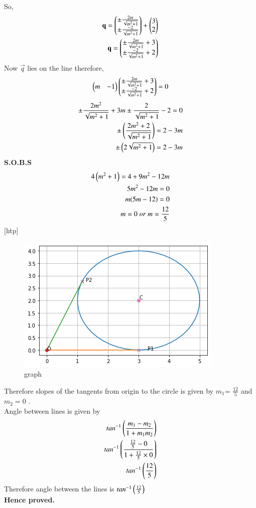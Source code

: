 \documentclass[journal,12pt,twocolumn]{IEEEtran}
\begin{document}
So,
\begin{align}
    \mathbf{q}=\begin{pmatrix}\pm \frac{2m}{\sqrt{m^2+1}} \\ \pm \frac{-2}{\sqrt{m^2+1}} \end{pmatrix} + \begin{pmatrix}3 \\ 2\end{pmatrix}\\
    \mathbf{q}= \begin{pmatrix}\pm \frac{2m}{\sqrt{m^2+1} }+3 \\ \pm \frac{-2}{\sqrt{m^2+1}} +2\end{pmatrix}
\end{align}
Now $\vec{q}$ lies on the line therefore,
\begin{align}
   \begin{pmatrix}m & -1\end{pmatrix} \begin{pmatrix}\pm \frac{2m}{\sqrt{m^2+1} }+3 \\ \pm \frac{-2}{\sqrt{m^2+1}} +2\end{pmatrix}  = 0
\end{align}
\begin{align}
    \pm \frac{2m^2}{\sqrt{m^2+1}}+ 3m  \pm\frac{2}{\sqrt{m^2+1}} -2=0 \\
    \pm\left(\frac{2m^2 + 2}{\sqrt{m^2+1}}\right)= 2-3m\\
    \pm \left(2\sqrt{m^2+1}\right)= 2-3m
\end{align}
\textbf{S.O.B.S}
\begin{align}
    4\left(m^2+1\right)=4 + 9m^2 -12m\\
    5m^2-12m=0\\
    m(5m-12)=0\\
    m=0 \;or\; m = \frac{12}{5}
\end{align}[htp]
    \begin{figure}
        \centering
        \includegraphics[width = \columnwidth]{Assignment_3.png}
        \caption{graph}
        \label{fig:my_label}
    \end{figure}
Therefore slopes of the tangents from origin to the circle is given by  $m_1$= $\frac{12}{5}$ and $m_2=0$ .\\
Angle between lines is given by 
\begin{align}
    tan^{-1}\left(\frac{m_1-m_2}{1+m_1 m_2}\right)\\
    tan^{-1} \left(\frac{\frac{12}{5}-0}{1+\frac{12}{5}\times0}\right)\\
    tan^{-1}\left(\frac{12}{5}\right)
\end{align}
Therefore angle between the lines is $tan^{-1}\left(\frac{12}{5}\right)$ \\
\textbf{Hence proved.}
\end{document}
